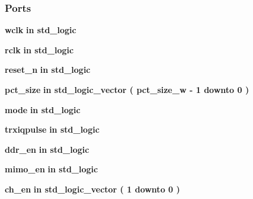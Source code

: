 \subsubsection*{Ports}
 \begin{DoxyCompactItemize}
\item 
{\bf wclk}  {\bfseries {\bfseries \textcolor{keywordflow}{in}\textcolor{vhdlchar}{ }}} {\bfseries \textcolor{comment}{std\+\_\+logic}\textcolor{vhdlchar}{ }} 
\item 
{\bf rclk}  {\bfseries {\bfseries \textcolor{keywordflow}{in}\textcolor{vhdlchar}{ }}} {\bfseries \textcolor{comment}{std\+\_\+logic}\textcolor{vhdlchar}{ }} 
\item 
{\bf reset\+\_\+n}  {\bfseries {\bfseries \textcolor{keywordflow}{in}\textcolor{vhdlchar}{ }}} {\bfseries \textcolor{comment}{std\+\_\+logic}\textcolor{vhdlchar}{ }} 
\item 
{\bf pct\+\_\+size}  {\bfseries {\bfseries \textcolor{keywordflow}{in}\textcolor{vhdlchar}{ }}} {\bfseries \textcolor{comment}{std\+\_\+logic\+\_\+vector}\textcolor{vhdlchar}{ }\textcolor{vhdlchar}{(}\textcolor{vhdlchar}{ }\textcolor{vhdlchar}{ }\textcolor{vhdlchar}{ }\textcolor{vhdlchar}{ }{\bfseries {\bf pct\+\_\+size\+\_\+w}} \textcolor{vhdlchar}{-\/}\textcolor{vhdlchar}{ } \textcolor{vhdldigit}{1} \textcolor{vhdlchar}{ }\textcolor{keywordflow}{downto}\textcolor{vhdlchar}{ }\textcolor{vhdlchar}{ } \textcolor{vhdldigit}{0} \textcolor{vhdlchar}{ }\textcolor{vhdlchar}{)}\textcolor{vhdlchar}{ }} 
\item 
{\bf mode}  {\bfseries {\bfseries \textcolor{keywordflow}{in}\textcolor{vhdlchar}{ }}} {\bfseries \textcolor{comment}{std\+\_\+logic}\textcolor{vhdlchar}{ }} 
\item 
{\bf trxiqpulse}  {\bfseries {\bfseries \textcolor{keywordflow}{in}\textcolor{vhdlchar}{ }}} {\bfseries \textcolor{comment}{std\+\_\+logic}\textcolor{vhdlchar}{ }} 
\item 
{\bf ddr\+\_\+en}  {\bfseries {\bfseries \textcolor{keywordflow}{in}\textcolor{vhdlchar}{ }}} {\bfseries \textcolor{comment}{std\+\_\+logic}\textcolor{vhdlchar}{ }} 
\item 
{\bf mimo\+\_\+en}  {\bfseries {\bfseries \textcolor{keywordflow}{in}\textcolor{vhdlchar}{ }}} {\bfseries \textcolor{comment}{std\+\_\+logic}\textcolor{vhdlchar}{ }} 
\item 
{\bf ch\+\_\+en}  {\bfseries {\bfseries \textcolor{keywordflow}{in}\textcolor{vhdlchar}{ }}} {\bfseries \textcolor{comment}{std\+\_\+logic\+\_\+vector}\textcolor{vhdlchar}{ }\textcolor{vhdlchar}{(}\textcolor{vhdlchar}{ }\textcolor{vhdlchar}{ } \textcolor{vhdldigit}{1} \textcolor{vhdlchar}{ }\textcolor{keywordflow}{downto}\textcolor{vhdlchar}{ }\textcolor{vhdlchar}{ } \textcolor{vhdldigit}{0} \textcolor{vhdlchar}{ }\textcolor{vhdlchar}{)}\textcolor{vhdlchar}{ }} 

\end{DoxyCompactItemize}
